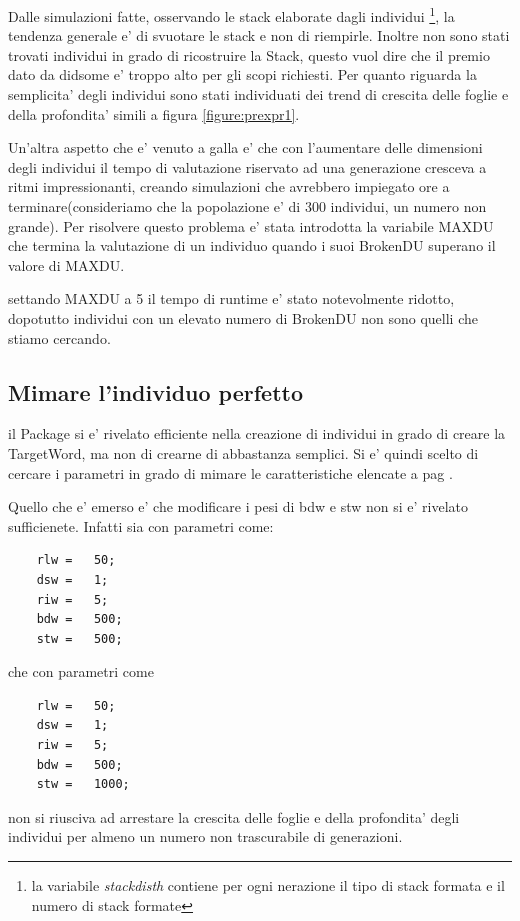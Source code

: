 \documentclass[12pt, a4paper]{article}
\begin{document}
Dalle simulazioni fatte, osservando le stack elaborate dagli individui
\footnote{la variabile {\itshape stackdisth} contiene per ogni nerazione il tipo di stack formata e il numero di stack formate},
la tendenza generale e' di svuotare le stack e non di riempirle. 
Inoltre non sono stati trovati individui in grado di ricostruire la Stack, questo vuol dire che il premio dato da didsome e' troppo alto per gli scopi richiesti. Per quanto riguarda la semplicita' degli individui sono stati individuati dei trend di crescita delle foglie e della profondita' simili a figura \ref{figure:prexpr1}.

Un'altra aspetto che e' venuto a galla e' che con l'aumentare delle dimensioni degli individui il tempo di valutazione riservato ad una generazione cresceva a ritmi impressionanti, creando simulazioni che avrebbero impiegato ore a terminare(consideriamo che la popolazione e' di 300 individui, un numero non grande). Per risolvere questo problema e' stata introdotta la variabile MAXDU che termina la valutazione di un individuo quando i suoi BrokenDU superano il valore di MAXDU.

settando MAXDU a 5 il tempo di runtime e' stato notevolmente ridotto, dopotutto individui con un elevato numero di BrokenDU non sono quelli che stiamo cercando.


\subsection{Mimare l'individuo perfetto}
il Package si e' rivelato efficiente nella creazione di individui in grado di creare la TargetWord, ma non di crearne di abbastanza semplici. Si e' quindi scelto di cercare i parametri in grado di mimare le caratteristiche elencate a pag \pageref{item:perf}.

Quello che e' emerso e' che modificare i pesi di bdw e stw non si e' rivelato sufficienete. Infatti sia con parametri come:
\begin{lstlisting}
	rlw	=	50;
	dsw	=	1;
	riw	=	5;
	bdw	=	500;
	stw	=	500;
\end{lstlisting}

che con parametri come
\begin{lstlisting}
	rlw	=	50;
	dsw	=	1;
	riw	=	5;
	bdw	=	500;
	stw	=	1000;
\end{lstlisting}

non si riusciva ad arrestare la crescita delle foglie e della profondita' degli individui per almeno un numero non trascurabile di generazioni.
\end{document}
